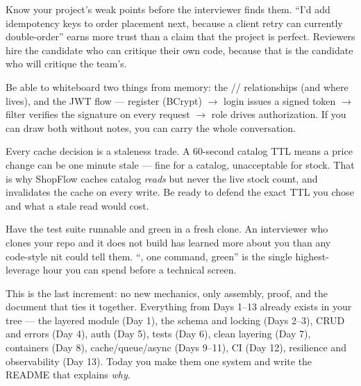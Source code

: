 \begin{seniornote}
Know your project's weak points before the interviewer finds them. ``I'd add idempotency keys to order placement next, because a client retry can currently double-order'' earns more trust than a claim that the project is perfect. Reviewers hire the candidate who can critique their own code, because that is the candidate who will critique the team's.
\end{seniornote}

\begin{interview}
Be able to whiteboard two things from memory: the // relationships (and where  lives), and the JWT flow --- register (BCrypt) $\rightarrow$ login issues a signed token $\rightarrow$ filter verifies the signature on every request $\rightarrow$ role drives authorization. If you can draw both without notes, you can carry the whole conversation.
\end{interview}

\begin{perfnote}
Every cache decision is a staleness trade. A 60-second catalog TTL means a price change can be one minute stale --- fine for a catalog, unacceptable for stock. That is why ShopFlow caches catalog \emph{reads} but never the live stock count, and invalidates the cache on every write. Be ready to defend the exact TTL you chose and what a stale read would cost.
\end{perfnote}

\begin{prodtip}
Have the test suite runnable and green in a fresh clone. An interviewer who clones your repo and it does not build has learned more about you than any code-style nit could tell them. ``, one command, green'' is the single highest-leverage hour you can spend before a technical screen.
\end{prodtip}


This is the last increment: no new mechanics, only assembly, proof, and the document that ties it together. Everything from Days 1--13 already exists in your tree --- the layered module (Day 1), the schema and locking (Days 2--3), CRUD and errors (Day 4), auth (Day 5), tests (Day 6), clean layering (Day 7), containers (Day 8), cache/queue/async (Days 9--11), CI (Day 12), resilience and observability (Day 13). Today you make them one system and write the README that explains \emph{why}.

